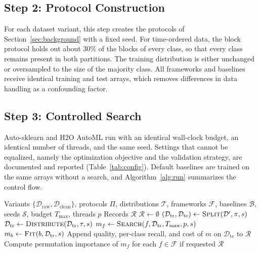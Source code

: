 \subsection{Step 2: Protocol Construction}
For each dataset variant, this step creates the protocols of Section~\ref{sec:background} with a fixed seed. For time-ordered data, the block protocol holds out about 30\% of the blocks of every class, so that every class remains present in both partitions. The training distribution is either unchanged or oversampled to the size of the majority class. All frameworks and baselines receive identical training and test arrays, which removes differences in data handling as a confounding factor.

\subsection{Step 3: Controlled Search}
Auto-sklearn and H2O AutoML run with an identical wall-clock budget, an identical number of threads, and the same seed. Settings that cannot be equalized, namely the optimization objective and the validation strategy, are documented and reported (Table~\ref{tab:config}). Default baselines are trained on the same arrays without a search, and Algorithm~\ref{alg:run} summarizes the control flow.

\begin{algorithm}[t]
\caption{Controlled Comparison}
\label{alg:run}
\footnotesize
\begin{algorithmic}[1]
\Require Variants $\{\mathcal{D}_{\mathrm{raw}},\mathcal{D}_{\mathrm{clean}}\}$, protocols $\Pi$, distributions $\mathcal{T}$, frameworks $\mathcal{F}$, baselines $\mathcal{B}$, seeds $\mathcal{S}$, budget $T_{\max}$, threads $p$
\Ensure Records $\mathcal{R}$
\State $\mathcal{R}\leftarrow\emptyset$
  \State $(\mathcal{D}_{\mathrm{tr}},\mathcal{D}_{\mathrm{te}})\leftarrow \textsc{Split}(\mathcal{D}',\pi,s)$
  \State $\mathcal{D}_{\mathrm{tr}}\leftarrow \textsc{Distribute}(\mathcal{D}_{\mathrm{tr}},\tau,s)$
    \State $m_f\leftarrow \textsc{Search}(f,\mathcal{D}_{\mathrm{tr}},T_{\max},p,s)$
  \EndFor
    \State $m_b\leftarrow \textsc{Fit}(b,\mathcal{D}_{\mathrm{tr}},s)$
  \EndFor
    \State Append quality, per-class recall, and cost of $m$ on $\mathcal{D}_{\mathrm{te}}$ to $\mathcal{R}$
  \EndFor
  \State Compute permutation importance of $m_f$ for each $f\in\mathcal{F}$ if requested
\EndFor
\State \Return $\mathcal{R}$
\end{algorithmic}
\end{algorithm}

